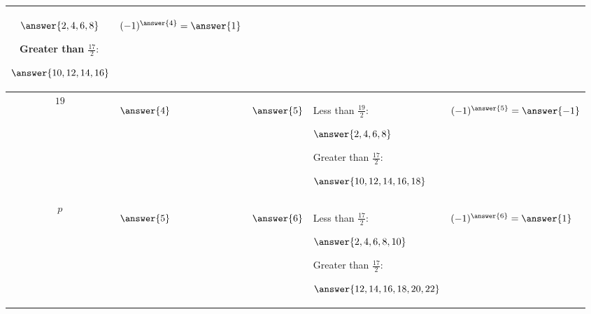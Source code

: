 \documentclass[handout]{ximera}
\begin{document}
\begin{br}
\begin{tabular}{c|p{1.5cm}|p{2.5cm}|p{7cm}|p{3cm}}
{\begin{prompt}
            $\answer{2,4,6,8}$\end{prompt}
                \\Greater than $\tfrac{17}{2}:$ \begin{prompt}
            $\answer{10,12,14,16}$\end{prompt}}
                & \begin{prompt}
            $(-1)^{\answer{4}}=\answer{1}$\end{prompt}\\\hline
        $19$ & \begin{prompt}
            $\answer{4}$\end{prompt}	& \begin{prompt}
            $\answer{5}$\end{prompt}
                & \makecell[l]{Less than $\tfrac{19}{2}:$ \begin{prompt}
            $\answer{2,4,6,8}$\end{prompt}
            \\Greater than $\tfrac{17}{2}:$ \begin{prompt}
            $\answer{10,12,14,16,18}$\end{prompt}}
            & \begin{prompt}
            $(-1)^{\answer{5}}=\answer{-1}$\end{prompt}\\\hline
            $p$ & \begin{prompt}
            $\answer{5}$\end{prompt}	& \begin{prompt}
            $\answer{6}$\end{prompt}
                & \makecell[l]{Less than $\tfrac{17}{2}:$ \begin{prompt}
            $\answer{2,4,6,8,10}$\end{prompt}
                \\Greater than $\tfrac{17}{2}:$ \begin{prompt}
            $\answer{12,14,16,18,20,22}$\end{prompt}}
                & \begin{prompt}
            $(-1)^{\answer{6}}=\answer{1}$\end{prompt}\\\hline
    \end{tabular}
\end{br}
\end{document}
